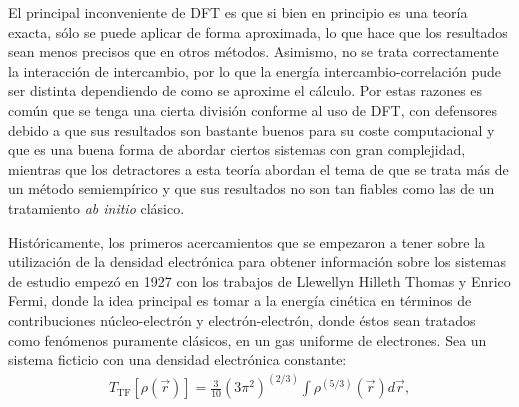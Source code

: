 %
%
El principal inconveniente de DFT es que si bien en principio es una teoría
exacta, sólo se puede aplicar de forma aproximada, lo que hace que los
resultados sean menos precisos que en otros métodos. Asimismo, no se trata
correctamente la interacción de intercambio, por lo que la energía
intercambio-correlación pude ser distinta dependiendo de como se aproxime el
cálculo. Por estas razones es común que se tenga una cierta división conforme
al uso de DFT, con defensores debido a que sus resultados son bastante buenos
para su coste computacional y que es una buena forma de abordar ciertos
sistemas con gran complejidad, mientras que los detractores a esta teoría
abordan el tema de que se trata más de un método semiempírico y que sus
resultados no son tan fiables como las de un tratamiento \textit{ab initio}
clásico.

Históricamente, los primeros acercamientos que se empezaron a tener sobre la
utilización de la densidad electrónica para obtener información sobre los
sistemas de estudio empezó en 1927 con los trabajos de Llewellyn Hilleth Thomas
y Enrico Fermi, donde la idea principal es tomar a la energía cinética en
términos de contribuciones núcleo-electrón y electrón-electrón, donde éstos
sean tratados como fenómenos puramente clásicos, en un gas uniforme de
electrones. Sea un sistema ficticio con una densidad electrónica constante:
\begin{align}
  {T}_{\mathrm{TF}}[\rho(\vec{r})]=\displaystyle\frac{3}{10}(3\pi^2)^{(2/3)}\int
  \rho^{(5/3)}(\vec{r})d\vec{r},
\end{align}

